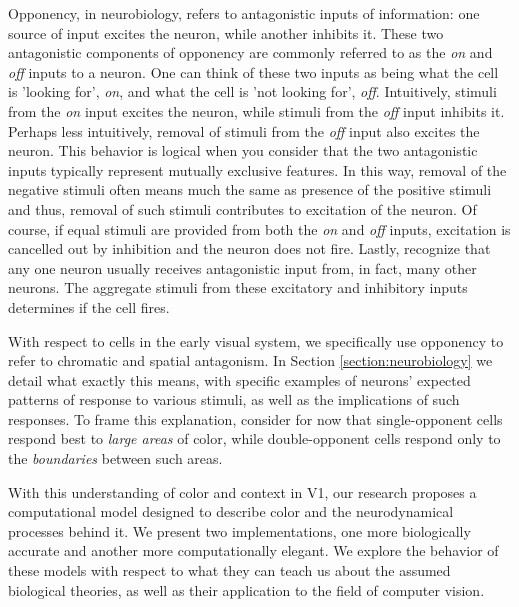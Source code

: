 \documentclass[journal,onecolumn]{IEEEtran}
\begin{document}
Opponency, in neurobiology, refers to antagonistic inputs of information: one source of input excites the neuron, while another inhibits it. These two antagonistic components of opponency are commonly referred to as the \textit{on} and \textit{off} inputs to a neuron. One can think of these two inputs as being what the cell is 'looking for', \textit{on}, and what the cell is 'not looking for', \textit{off}. Intuitively, stimuli from the \textit{on} input excites the neuron, while stimuli from the \textit{off} input inhibits it. Perhaps less intuitively, removal of stimuli from the \textit{off} input also excites the neuron. This behavior is logical when you consider that the two antagonistic inputs typically represent mutually exclusive features. In this way, removal of the negative stimuli often means much the same as presence of the positive stimuli and thus, removal of such stimuli contributes to excitation of the neuron. Of course, if equal stimuli are provided from both the \textit{on} and \textit{off} inputs, excitation is cancelled out by inhibition and the neuron does not fire. Lastly, recognize that any one neuron usually receives antagonistic input from, in fact, many other neurons. The aggregate stimuli from these excitatory and inhibitory inputs determines if the cell fires.

With respect to cells in the early visual system, we specifically use opponency to refer to chromatic and spatial antagonism. In Section \ref{section:neurobiology} we detail what exactly this means, with specific examples of neurons' expected patterns of response to various stimuli, as well as the implications of such responses. To frame this explanation, consider for now that single-opponent cells respond best to \textit{large areas} of color, while double-opponent cells respond only to the \textit{boundaries} between such areas.

With this understanding of color and context in V1, our research proposes a computational model designed to describe color and the neurodynamical processes behind it. We present two implementations, one more biologically accurate and another more computationally elegant. We explore the behavior of these models with respect to what they can teach us about the assumed biological theories, as well as their application to the field of computer vision.


%
%
%
\end{document}
